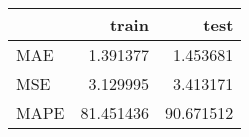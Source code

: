 \begin{tabular}{lrr}
\toprule
{} &      train &       test \\
\midrule
MAE  &   1.391377 &   1.453681 \\
MSE  &   3.129995 &   3.413171 \\
MAPE &  81.451436 &  90.671512 \\
\bottomrule
\end{tabular}
